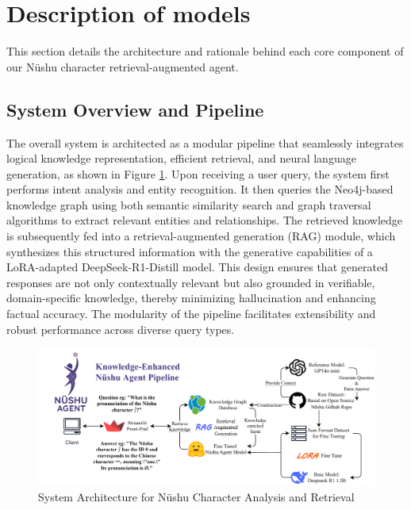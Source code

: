 \documentclass{article}
\begin{document}

\section{Description of models}
\label{sec:models}
    This section details the architecture and rationale behind each core component of our N\"{u}shu character retrieval-augmented agent. 


\subsection{System Overview and Pipeline}
\label{ssec:system_overview}
    The overall system is architected as a modular pipeline that seamlessly integrates logical knowledge representation, efficient retrieval, and neural language generation, as shown in Figure \ref{fig:nvshu_system_architecture}. 
    Upon receiving a user query, the system first performs intent analysis and entity recognition. It then queries the Neo4j-based knowledge graph using both semantic similarity search and graph traversal algorithms to extract relevant entities and relationships. The retrieved knowledge is subsequently fed into a retrieval-augmented generation (RAG) module, which synthesizes this structured information with the generative capabilities of a LoRA-adapted DeepSeek-R1-Distill model. This design ensures that generated responses are not only contextually relevant but also grounded in verifiable, domain-specific knowledge, thereby minimizing hallucination and enhancing factual accuracy. The modularity of the pipeline facilitates extensibility and robust performance across diverse query types.
    \begin{figure}[htb]
    \centering
    \includegraphics[width=\textwidth]{images/nvshu_system.drawio.pdf}
    \caption{System Architecture for N\"{u}shu Character Analysis and Retrieval}
    \label{fig:nvshu_system_architecture}
    \end{figure}
\end{document}
